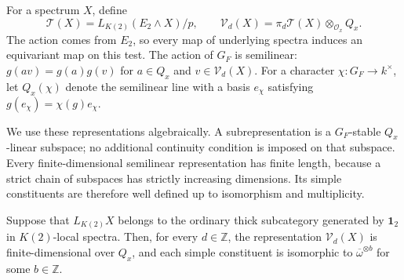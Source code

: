 For a spectrum \(X\), define
\begin{equation}\label{eq:generic-test}
 \mathcal T(X)=L_{K(2)}(E_2\wedge X)/p,
 \qquad
 \mathcal V_d(X)=\pi_d\mathcal T(X)\otimes_{\mathcal O_x}Q_x.
\end{equation}
The action comes from \(E_2\), so every map of underlying spectra induces
an equivariant map on this test. The action of \(G_F\) is semilinear:
\(g(av)=g(a)g(v)\) for \(a\in Q_x\) and \(v\in\mathcal V_d(X)\).
For a character \(\chi:G_F\to k^\times\), let \(Q_x(\chi)\) denote the
semilinear line with a basis \(e_\chi\) satisfying
\(g(e_\chi)=\chi(g)e_\chi\).

We use these representations algebraically. A subrepresentation is a
\(G_F\)-stable \(Q_x\)-linear subspace; no additional continuity condition
is imposed on that subspace. Every finite-dimensional semilinear
representation has finite length, because a strict chain of subspaces has
strictly increasing dimensions. Its simple constituents are therefore
well defined up to isomorphism and multiplicity.

\begin{proposition}
\label{prop:constituent-test}
Suppose that \(L_{K(2)}X\) belongs to the ordinary thick subcategory
generated by \(\mathbf 1_2\) in \(K(2)\)-local spectra. Then, for every
\(d\in\mathbb Z\), the representation \(\mathcal V_d(X)\) is
finite-dimensional over \(Q_x\), and each simple constituent is isomorphic
to \(\overline\omega^{\otimes b}\) for some \(b\in\mathbb Z\).
\end{proposition}

